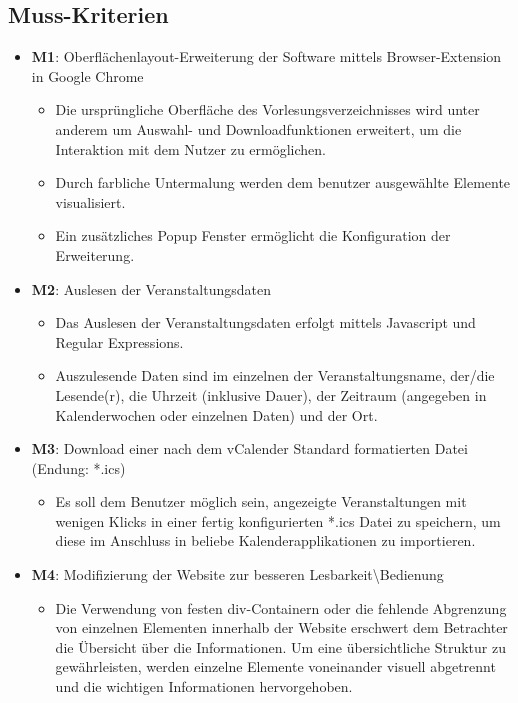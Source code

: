 \documentclass[11pt]{report}
\begin{document}
\subsection*{Muss-Kriterien}
\begin{itemize}
\item \textbf{M1}: Oberfl\"achenlayout-Erweiterung der Software mittels Browser-Extension in Google Chrome
    \begin{itemize}
    \item Die urspr\"ungliche Oberfläche des Vorlesungsverzeichnisses wird unter anderem um Auswahl- und Downloadfunktionen erweitert, um die Interaktion mit dem Nutzer zu erm\"oglichen.
    \item Durch farbliche Untermalung werden dem benutzer ausgew\"ahlte Elemente visualisiert.
    \item Ein zus\"atzliches Popup Fenster erm\"oglicht die Konfiguration der Erweiterung.
    \end{itemize}
\item \textbf{M2}: Auslesen der Veranstaltungsdaten
    \begin{itemize}
    \item Das Auslesen der Veranstaltungsdaten erfolgt mittels Javascript und Regular Expressions.
    \item Auszulesende Daten sind im einzelnen der Veranstaltungsname, der/die Lesende(r), die Uhrzeit (inklusive Dauer), der Zeitraum (angegeben in Kalenderwochen oder einzelnen Daten) und der Ort.
    \end{itemize}
\item \textbf{M3}: Download einer nach dem vCalender Standard formatierten Datei (Endung: *.ics)
    \begin{itemize}
    \item Es soll dem Benutzer m\"oglich sein, angezeigte Veranstaltungen mit wenigen Klicks in einer fertig konfigurierten *.ics Datei zu speichern, um diese im Anschluss in beliebe Kalenderapplikationen zu importieren.
    \end{itemize}
\item \textbf{M4}: Modifizierung der Website zur besseren Lesbarkeit\textbackslash Bedienung
    \begin{itemize}
    \item Die Verwendung von festen div-Containern oder die fehlende Abgrenzung von einzelnen Elementen innerhalb der Website erschwert dem Betrachter die \"Ubersicht \"uber die Informationen. Um eine \"ubersichtliche Struktur zu gew\"ahrleisten, werden einzelne Elemente voneinander visuell abgetrennt und die wichtigen Informationen hervorgehoben.
    \end{itemize}
\end{itemize}
\end{document}

